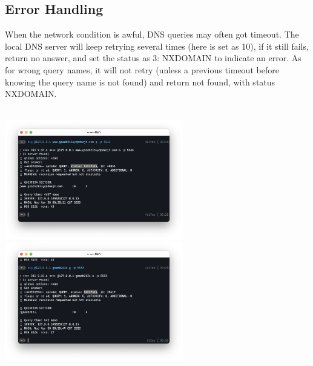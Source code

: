\documentclass[onecolumn, oneside, ctexart]{SUSTechHomework}
\begin{document}
\subsection{Error Handling}
When the network condition is awful, DNS queries may often got timeout. The local DNS server will keep retrying several times (here is set as 10), if it still fails, return no answer, and set the status as 3: NXDOMAIN to indicate an error. As for wrong query names, it will not retry (unless a previous timeout before knowing the query name is not found) and return not found, with status NXDOMAIN.\\~\\
\centerline{\includegraphics[height=5.2cm]{fig/e1}\quad
			\includegraphics[height=5.2cm]{fig/e2}}
\end{document}
